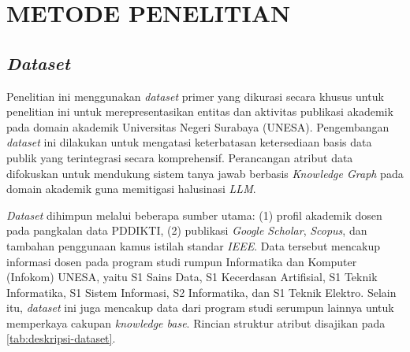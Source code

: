 \chapter{METODE PENELITIAN}
\section{\textit{Dataset}}

Penelitian ini menggunakan \textit{dataset} primer yang dikurasi secara khusus untuk penelitian ini untuk merepresentasikan entitas dan aktivitas publikasi akademik pada domain akademik Universitas Negeri Surabaya (UNESA). Pengembangan \textit{dataset} ini dilakukan untuk mengatasi keterbatasan ketersediaan basis data publik yang terintegrasi secara komprehensif. Perancangan atribut data difokuskan untuk mendukung sistem tanya jawab berbasis \textit{Knowledge Graph} pada domain akademik guna memitigasi halusinasi \textit{LLM}.

\textit{Dataset} dihimpun melalui beberapa sumber utama: (1) profil akademik dosen pada pangkalan data PDDIKTI, (2) publikasi \textit{Google Scholar}, \textit{Scopus}, dan tambahan penggunaan kamus istilah standar \textit{IEEE}. Data tersebut mencakup informasi dosen pada program studi rumpun Informatika dan Komputer (Infokom) UNESA, yaitu S1 Sains Data, S1 Kecerdasan Artifisial, S1 Teknik Informatika, S1 Sistem Informasi, S2 Informatika, dan S1 Teknik Elektro. Selain itu, \textit{dataset} ini juga mencakup data dari program studi serumpun lainnya untuk memperkaya cakupan \textit{knowledge base}. Rincian struktur atribut disajikan pada \ref{tab:deskripsi-dataset}.

